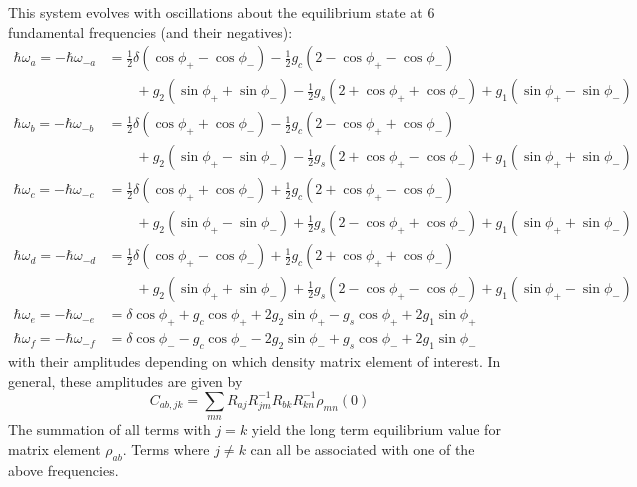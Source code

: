 This system evolves with oscillations about the equilibrium state at 6 fundamental frequencies (and their negatives):
\begin{subequations}
    \begin{align}
        \hbar\omega_a = -\hbar\omega_{-a} & = \frac{1}{2}\delta(\cos\phi_+ - \cos\phi_-) - \frac{1}{2}g_c(2 - \cos\phi_+ - \cos\phi_-) \nonumber                   \\
                                          & \qquad + g_{2}(\sin\phi_+ + \sin\phi_-) - \frac{1}{2}g_s(2 + \cos\phi_+ + \cos\phi_-) + g_{1}(\sin\phi_+ - \sin\phi_-) \\
        \hbar\omega_b = -\hbar\omega_{-b} & = \frac{1}{2}\delta(\cos\phi_+ + \cos\phi_-) - \frac{1}{2}g_c(2 - \cos\phi_+ + \cos\phi_-)\nonumber                    \\
                                          & \qquad + g_{2}(\sin\phi_+ - \sin\phi_-) - \frac{1}{2}g_s(2 + \cos\phi_+ - \cos\phi_-)+ g_{1}(\sin\phi_+ + \sin\phi_-)  \\
        \hbar\omega_c = -\hbar\omega_{-c} & = \frac{1}{2}\delta(\cos\phi_+ + \cos\phi_-) + \frac{1}{2}g_c(2 + \cos\phi_+ - \cos\phi_-) \nonumber                   \\
                                          & \qquad+ g_{2}(\sin\phi_+ - \sin\phi_-) + \frac{1}{2}g_s(2 - \cos\phi_+ + \cos\phi_-)+ g_{1}(\sin\phi_+ + \sin\phi_-)   \\
        \hbar\omega_d = -\hbar\omega_{-d} & = \frac{1}{2}\delta(\cos\phi_+ - \cos\phi_-) + \frac{1}{2}g_c(2 + \cos\phi_+ + \cos\phi_-) \nonumber                   \\
                                          & \qquad+ g_{2}(\sin\phi_+ + \sin\phi_-) + \frac{1}{2}g_s(2 - \cos\phi_+ - \cos\phi_-)+ g_{1}(\sin\phi_+ - \sin\phi_-)   \\
        \hbar\omega_e = -\hbar\omega_{-e} & = \delta\cos\phi_+ + g_c\cos\phi_+ + 2g_{2} \sin\phi_+ - g_s\cos\phi_+ + 2g_{1}\sin\phi_+                              \\
        \hbar\omega_f = -\hbar\omega_{-f} & = \delta\cos\phi_- - g_c\cos\phi_- - 2g_{2} \sin\phi_- + g_s\cos\phi_- + 2g_{1}\sin\phi_-
    \end{align}
\end{subequations}
with their amplitudes depending on which density matrix element of interest. In general, these amplitudes are given by
\begin{equation}
    C_{ab,jk}=\sum_{mn}R_{aj}R_{jm}^{-1}R_{bk}R_{kn}^{-1}\rho_{mn}(0)
\end{equation}
The summation of all terms with $j=k$ yield the long term equilibrium value for matrix element $\rho_{ab}$. Terms where $j\ne k$ can all be associated with one of the above frequencies.

